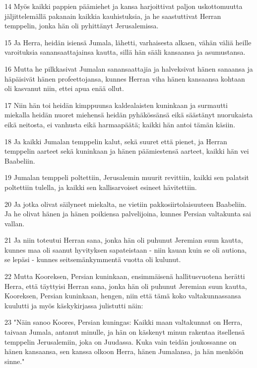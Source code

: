 \par 14 Myös kaikki pappien päämiehet ja kansa harjoittivat paljon uskottomuutta jäljittelemällä pakanain kaikkia kauhistuksia, ja he saastuttivat Herran temppelin, jonka hän oli pyhittänyt Jerusalemissa.
\par 15 Ja Herra, heidän isiensä Jumala, lähetti, varhaisesta alkaen, vähän väliä heille varoituksia sanansaattajainsa kautta, sillä hän sääli kansaansa ja asumustansa.
\par 16 Mutta he pilkkasivat Jumalan sanansaattajia ja halveksivat hänen sanaansa ja häpäisivät hänen profeettojansa, kunnes Herran viha hänen kansaansa kohtaan oli kasvanut niin, ettei apua enää ollut.
\par 17 Niin hän toi heidän kimppuunsa kaldealaisten kuninkaan ja surmautti miekalla heidän nuoret miehensä heidän pyhäkössänsä eikä säästänyt nuorukaista eikä neitosta, ei vanhusta eikä harmaapäätä; kaikki hän antoi tämän käsiin.
\par 18 Ja kaikki Jumalan temppelin kalut, sekä suuret että pienet, ja Herran temppelin aarteet sekä kuninkaan ja hänen päämiestensä aarteet, kaikki hän vei Baabeliin.
\par 19 Jumalan temppeli poltettiin, Jerusalemin muurit revittiin, kaikki sen palatsit poltettiin tulella, ja kaikki sen kallisarvoiset esineet hävitettiin.
\par 20 Ja jotka olivat säilyneet miekalta, ne vietiin pakkosiirtolaisuuteen Baabeliin. Ja he olivat hänen ja hänen poikiensa palvelijoina, kunnes Persian valtakunta sai vallan.
\par 21 Ja niin toteutui Herran sana, jonka hän oli puhunut Jeremian suun kautta, kunnes maa oli saanut hyvityksen sapateistaan - niin kauan kuin se oli autiona, se lepäsi - kunnes seitsemänkymmentä vuotta oli kulunut.
\par 22 Mutta Kooreksen, Persian kuninkaan, ensimmäisenä hallitusvuotena herätti Herra, että täyttyisi Herran sana, jonka hän oli puhunut Jeremian suun kautta, Kooreksen, Persian kuninkaan, hengen, niin että tämä koko valtakunnassansa kuulutti ja myös käskykirjassa julistutti näin:
\par 23 "Näin sanoo Koores, Persian kuningas: Kaikki maan valtakunnat on Herra, taivaan Jumala, antanut minulle, ja hän on käskenyt minun rakentaa itsellensä temppelin Jerusalemiin, joka on Juudassa. Kuka vain teidän joukossanne on hänen kansaansa, sen kanssa olkoon Herra, hänen Jumalansa, ja hän menköön sinne."


